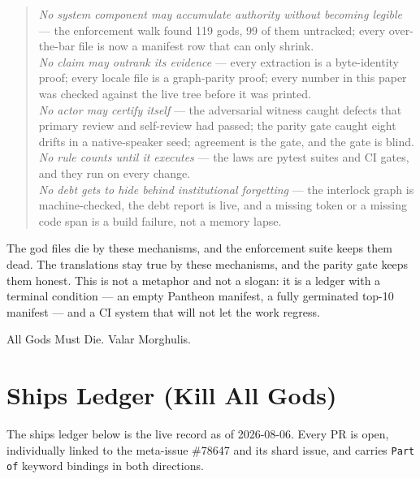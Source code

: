 \documentclass[11pt]{article}
\theoremstyle{definition}
\theoremstyle{plain}
\theoremstyle{remark}
\begin{document}
\begin{quote}
\emph{No system component may accumulate authority without becoming
legible} --- the enforcement walk found 119 gods, 99 of them untracked;
every over-the-bar file is now a manifest row that can only shrink.\\
\emph{No claim may outrank its evidence} --- every extraction is a
byte-identity proof; every locale file is a graph-parity proof; every
number in this paper was checked against the live tree before it was
printed.\\
\emph{No actor may certify itself} --- the adversarial witness caught
defects that primary review and self-review had passed; the parity gate
caught eight drifts in a native-speaker seed; agreement is the gate, and
the gate is blind.\\
\emph{No rule counts until it executes} --- the laws are pytest suites and
CI gates, and they run on every change.\\
\emph{No debt gets to hide behind institutional forgetting} --- the
interlock graph is machine-checked, the debt report is live, and a missing
token or a missing code span is a build failure, not a memory lapse.
\end{quote}

The god files die by these mechanisms, and the enforcement suite keeps them
dead. The translations stay true by these mechanisms, and the parity gate
keeps them honest. This is not a metaphor and not a slogan: it is a ledger
with a terminal condition --- an empty Pantheon manifest, a fully germinated
top-10 manifest --- and a CI system that will not let the work regress.

All Gods Must Die. Valar Morghulis.


\appendix

\section{Ships Ledger (Kill All Gods)}
\label{app:ships}

The ships ledger below is the live record as of 2026-08-06. Every PR is
open, individually linked to the meta-issue \#78647 and its shard issue, and
carries \texttt{Part of} keyword bindings in both directions.
\end{document}
